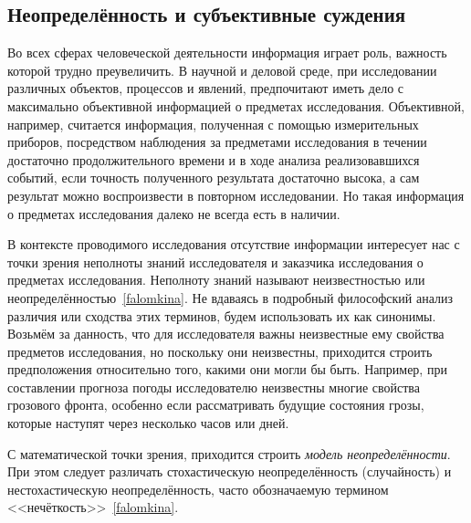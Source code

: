
\subsection{Неопределённость и субъективные суждения}
\label{sec:intro_uncertainty}

Во всех сферах человеческой деятельности информация играет роль, важность которой трудно преувеличить. В научной и деловой среде, при исследовании различных объектов, процессов и явлений,  предпочитают иметь дело с максимально объективной информацией о предметах исследования. Объективной, например, считается информация, полученная с помощью измерительных приборов, посредством наблюдения за предметами исследования в течении достаточно продолжительного времени и в ходе анализа реализовавшихся событий, если точность полученного результата достаточно высока, а сам результат можно воспроизвести в повторном исследовании. Но такая информация о предметах исследования далеко не всегда есть в наличии. 

В контексте проводимого исследования отсутствие информации интересует нас с точки зрения неполноты знаний исследователя и заказчика исследования о предметах исследования. Неполноту знаний называют неизвестностью или неопределённостью~\ref{falomkina}.  Не вдаваясь в подробный философский анализ различия или сходства этих терминов, будем использовать их как синонимы.  Возьмём за данность, что для исследователя важны неизвестные ему свойства предметов исследования, но поскольку они неизвестны, приходится строить предположения относительно того, какими они могли бы быть. Например, при составлении прогноза погоды исследователю неизвестны многие свойства грозового фронта, особенно если рассматривать будущие состояния грозы, которые наступят через несколько часов или дней.

 С математической точки зрения, приходится строить {\sl модель неопределённости}.  При этом следует различать стохастическую неопределённость (случайность) и нестохастическую неопределённость, часто обозначаемую термином <<нечёткость>>~\ref{falomkina}. 
 
